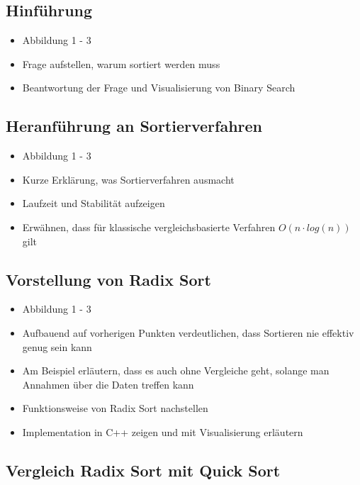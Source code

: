 \documentclass[a4paper, 12pt, oneside]{article}
\begin{document}
    \subsection{Hinführung}

    \begin{itemize}
        \item Abbildung 1 - 3
        \item Frage aufstellen, warum sortiert werden muss
        \item Beantwortung der Frage und Visualisierung von Binary Search
    \end{itemize}

    \subsection{Heranführung an Sortierverfahren}

    \begin{itemize}
        \item Abbildung 1 - 3
        \item Kurze Erklärung, was Sortierverfahren ausmacht
        \item Laufzeit und Stabilität aufzeigen
        \item Erwähnen, dass für klassische vergleichsbasierte Verfahren $O(n \cdot log(n))$ gilt
    \end{itemize}

    \subsection{Vorstellung von Radix Sort}

    \begin{itemize}
        \item Abbildung 1 - 3
        \item Aufbauend auf vorherigen Punkten verdeutlichen, dass Sortieren nie effektiv genug sein kann
        \item Am Beispiel erläutern, dass es auch ohne Vergleiche geht, solange man Annahmen über die Daten treffen kann
        \item Funktionsweise von Radix Sort nachstellen
        \item Implementation in C++ zeigen und mit Visualisierung erläutern 
    \end{itemize}

    \subsection{Vergleich Radix Sort mit Quick Sort}
\end{document}
